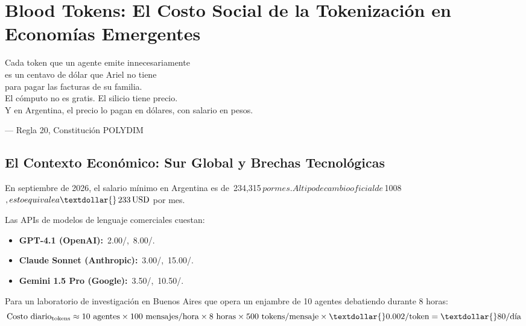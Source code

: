 ﻿\documentclass{article}
\begin{document}
\chapter{Blood Tokens: El Costo Social de la Tokenización en Economías Emergentes}
\label{ch:latam}

\epigraph{Cada token que un agente emite innecesariamente\\
es un centavo de dólar que Ariel no tiene\\
para pagar las facturas de su familia.\\
El cómputo no es gratis. El silicio tiene precio.\\
Y en Argentina, el precio lo pagan en dólares, con salario en pesos.}{--- Regla 20, Constitución POLYDIM}

\section{El Contexto Económico: Sur Global y Brechas Tecnológicas}

En septiembre de 2026, el salario mínimo en Argentina es de
\textdollar{}\,234{,}315\,$ por mes. Al tipo de cambio oficial de
$\textdollar{}\,1008\,$, esto equivale a \textdollar{}\,233\,\text{USD}$ por mes.

Las APIs de modelos de lenguaje comerciales cuestan:
\begin{itemize}
\item \textbf{GPT-4.1 (OpenAI):} \textdollar{}\,2.00/, \textdollar{}\,8.00/.
\item \textbf{Claude Sonnet (Anthropic):} \textdollar{}\,3.00/, \textdollar{}\,15.00/.
\item \textbf{Gemini 1.5 Pro (Google):} \textdollar{}\,3.50/, \textdollar{}\,10.50/.
\end{itemize}

Para un laboratorio de investigación en Buenos Aires que opera un enjambre de
10 agentes debatiendo durante 8 horas:
\begin{equation}
\text{Costo diario}_{\text{tokens}} \approx 10 \text{ agentes} \times 100 \text{ mensajes/hora} \times 8 \text{ horas} \times 500 \text{ tokens/mensaje} \times \textdollar{}0.002/\text{token} = \textdollar{}80/\text{día}
\end{equation}
\end{document}

